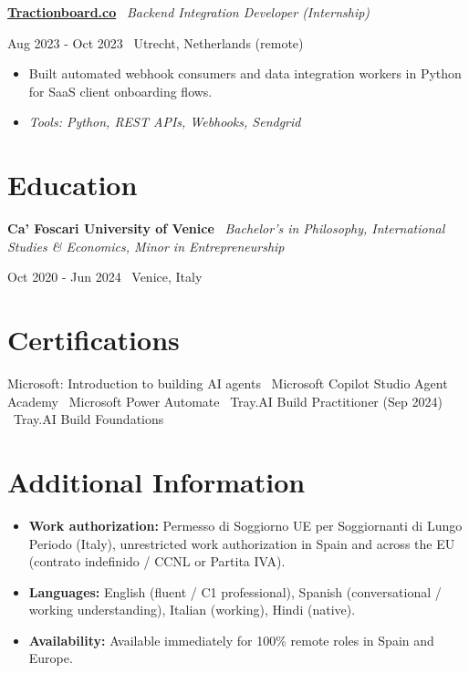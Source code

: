 \documentclass[a4paper,10pt]{article}
\newcommand{\role}[4]{%
  \vspace{2pt}\noindent
  \begin{minipage}[t]{0.70\textwidth}\raggedright\textbf{#1} \textbullet\ \textit{#3}\end{minipage}%
  \hfill
  \begin{minipage}[t]{0.28\textwidth}\raggedleft\footnotesize\color{gray}#2 \textbullet\ #4\end{minipage}%
  \vspace{1pt}%
}
\begin{document}
\role{\href{https://tractionboard.co}{Tractionboard.co}}{Aug 2023 - Oct 2023}{Backend Integration Developer (Internship)}{Utrecht, Netherlands (remote)}
\begin{itemize}
  \item Built automated webhook consumers and data integration workers in Python for SaaS client onboarding flows.
  \item \textit{Tools: Python, REST APIs, Webhooks, Sendgrid}
\end{itemize}

\section{Education}
\role{Ca' Foscari University of Venice}{Oct 2020 - Jun 2024}{Bachelor's in Philosophy, International Studies \& Economics, Minor in Entrepreneurship}{Venice, Italy}

\section{Certifications}
Microsoft: Introduction to building AI agents \textbullet\ Microsoft Copilot Studio Agent Academy \textbullet\ Microsoft Power Automate \textbullet\ Tray.AI Build Practitioner (Sep 2024) \textbullet\ Tray.AI Build Foundations

\section{Additional Information}
\begin{itemize}
  \item \textbf{Work authorization:} Permesso di Soggiorno UE per Soggiornanti di Lungo Periodo (Italy), unrestricted work authorization in Spain and across the EU (contrato indefinido / CCNL or Partita IVA).
  \item \textbf{Languages:} English (fluent / C1 professional), Spanish (conversational / working understanding), Italian (working), Hindi (native).
  \item \textbf{Availability:} Available immediately for 100\% remote roles in Spain and Europe.
\end{itemize}

\end{document}
